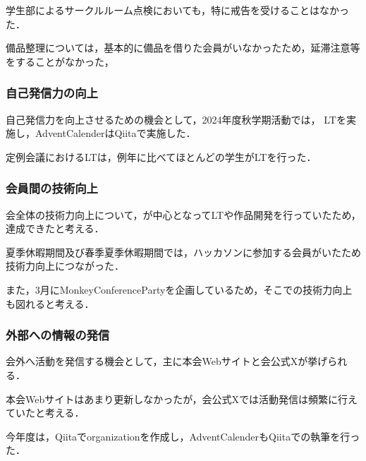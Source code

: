     学生部によるサークルルーム点検においても，特に戒告を受けることはなかった．


    備品整理については，基本的に備品を借りた会員がいなかったため，延滞注意等をすることがなかった，


\subsubsection*{自己発信力の向上}
    自己発信力を向上させるための機会として，2024年度秋学期活動では，
    LTを実施し，AdventCalenderはQiitaで実施した．

    定例会議におけるLTは，例年に比べてほとんどの学生がLTを行った．

\subsubsection*{会員間の技術向上}
    会全体の技術力向上について，\firstGrade{}が中心となってLTや作品開発を行っていたため，達成できたと考える．

    夏季休暇期間及び春季夏季休暇期間では，ハッカソンに参加する会員がいたため技術力向上につながった．

    また，3月にMonkeyConferencePartyを企画しているため，そこでの技術力向上も図れると考える．

\subsubsection*{外部への情報の発信}
    会外へ活動を発信する機会として，主に本会Webサイトと会公式Xが挙げられる．

    本会Webサイトはあまり更新しなかったが，会公式Xでは活動発信は頻繁に行えていたと考える．

    今年度は，Qiitaでorganizationを作成し，AdventCalenderもQiitaでの執筆を行った．

